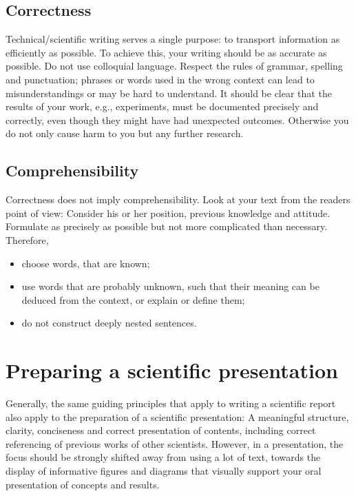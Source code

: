 \subsection{Correctness}
Technical/scientific writing serves a single purpose: to transport information as efficiently as possible.
To achieve this, your writing should be as accurate as possible. 
Do not use colloquial language.
Respect the rules of grammar, spelling and punctuation; phrases or words used in the wrong context can lead to misunderstandings or may be hard to understand.
It should be clear that the results of your work, e.g., experiments, must be documented precisely and correctly, even though they might have had unexpected outcomes.
Otherwise you do not only cause harm to you but any further research.


\subsection{Comprehensibility}
Correctness does not imply comprehensibility.
Look at your text from the readers point of view: Consider his or her position, previous knowledge and attitude. Formulate as precisely as possible but not more complicated than necessary. 
Therefore, 
\begin{itemize}
    \item choose words, that are known;
    \item use words that are probably unknown, such that their meaning can be deduced from the context, or explain or define them;
    \item do not construct deeply nested sentences.
\end{itemize}

\section{Preparing a scientific presentation}
Generally, the same guiding principles that apply to writing a scientific report also apply to the preparation of a scientific presentation: A meaningful structure, clarity, conciseness and correct presentation of contents, including correct referencing of previous works of other scientists.
However, in a presentation, the focus should be strongly shifted away from using a lot of text, towards the display of informative figures and diagrams that visually support your oral presentation of concepts and results.

